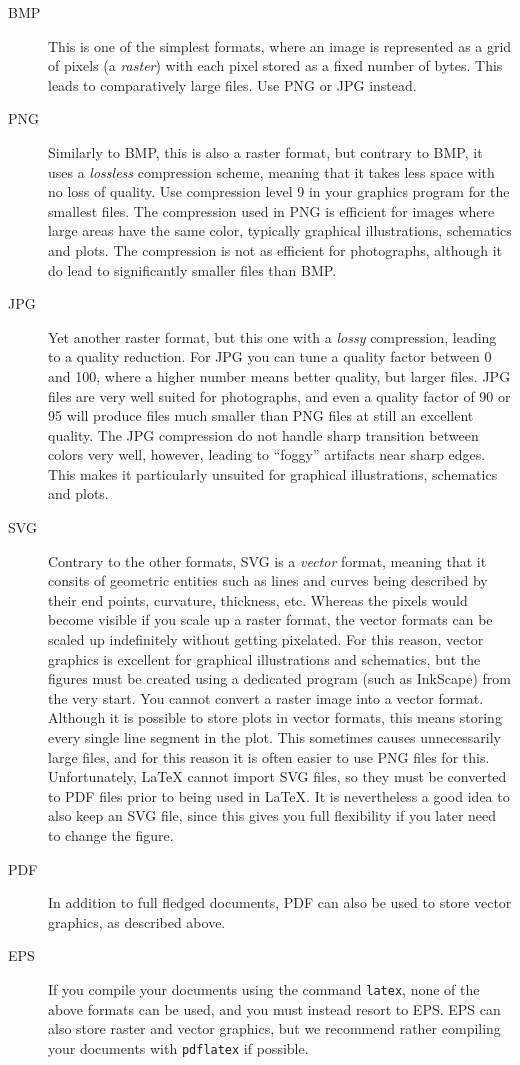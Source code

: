 \documentclass[12pt,a4paper]{article}
\begin{document}
\begin{description}
    \item[BMP] This is one of the simplest formats, where an image is represented as a grid of pixels (a \emph{raster}) with each pixel stored as a fixed number of bytes. This leads to comparatively large files. Use PNG or JPG instead.
    \item[PNG] Similarly to BMP, this is also a raster format, but contrary to BMP, it uses a \emph{lossless} compression scheme, meaning that it takes less space with no loss of quality. Use compression level 9 in your graphics program for the smallest files. The compression used in PNG is efficient for images where large areas have the same color, typically graphical illustrations, schematics and plots. The compression is not as efficient for photographs, although it do lead to significantly smaller files than BMP.
    \item[JPG] Yet another raster format, but this one with a \emph{lossy} compression, leading to a quality reduction. For JPG you can tune a quality factor between 0 and 100, where a higher number means better quality, but larger files. JPG files are very well suited for photographs, and even a quality factor of 90 or 95 will produce files much smaller than PNG files at still an excellent quality. The JPG compression do not handle sharp transition between colors very well, however, leading to ``foggy'' artifacts near sharp edges. This makes it particularly unsuited for graphical illustrations, schematics and plots.
    \item[SVG] Contrary to the other formats, SVG is a \emph{vector} format, meaning that it consits of geometric entities such as lines and curves being described by their end points, curvature, thickness, etc. Whereas the pixels would become visible if you scale up a raster format, the vector formats can be scaled up indefinitely without getting pixelated. For this reason, vector graphics is excellent for graphical illustrations and schematics, but the figures must be created using a dedicated program (such as InkScape) from the very start. You cannot convert a raster image into a vector format. Although it is possible to store plots in vector formats, this means storing every single line segment in the plot. This sometimes causes unnecessarily large files, and for this reason it is often easier to use PNG files for this. Unfortunately, \LaTeX{} cannot import SVG files, so they must be converted to PDF files prior to being used in \LaTeX{}. It is nevertheless a good idea to also keep an SVG file, since this gives you full flexibility if you later need to change the figure.
    \item[PDF] In addition to full fledged documents, PDF can also be used to store vector graphics, as described above.
    \item[EPS] If you compile your documents using the command \verb|latex|, none of the above formats can be used, and you must instead resort to EPS. EPS can also store raster and vector graphics, but we recommend rather compiling your documents with \verb|pdflatex| if possible.
\end{description}
\end{document}
